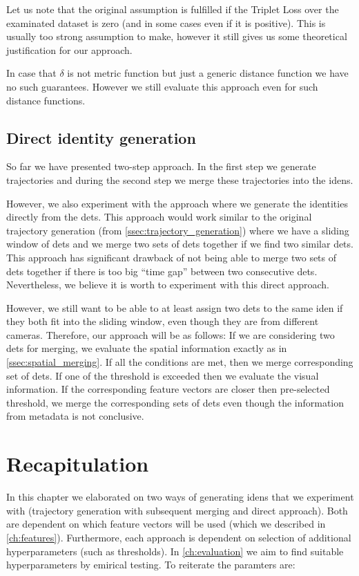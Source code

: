 Let us note that the original assumption is fulfilled if the Triplet Loss
over the examinated dataset is zero (and in some cases even if it is positive).
This is usually too strong assumption to make, however it still gives us some
theoretical justification for our approach.

In case that $\delta$ is not metric function but just a generic distance
function we have no such guarantees. However we still evaluate this approach
even for such distance functions.

\subsection{Direct identity generation}

So far we have presented two-step approach. In the first step we generate
trajectories and during the second step we merge these trajectories into
the \glspl{iden}.

However, we also experiment with the approach where we generate the identities directly from the \glspl{det}. This approach would work similar to the original trajectory generation (from \autoref{ssec:trajectory_generation}) where we have a sliding window of \glspl{det} and we merge two sets of \glspl{det} together if we find two similar \glspl{det}. This approach has significant drawback of not being able to merge two sets of \glspl{det} together if there is too big ``time gap'' between two consecutive \glspl{det}. Nevertheless, we believe it is worth to experiment with this direct approach.

However, we still want to be able to at least assign two \glspl{det} to the
same \gls{iden} if they both fit into the sliding window, even though they are
from different cameras. Therefore, our approach will be as follows: If we are
considering two \glspl{det} for merging, we evaluate the spatial information
exactly as in \autoref{ssec:spatial_merging}. If all the conditions are met,
then we merge corresponding set of \glspl{det}. If one of the threshold is
exceeded then we evaluate the visual information. If the corresponding feature
vectors are closer then pre-selected threshold, we merge the corresponding sets of \glspl{det} even though the information from metadata is not conclusive.

\section{Recapitulation}

In this chapter we elaborated on two ways of generating \glspl{iden} that we experiment with (trajectory generation with subsequent merging and direct approach). Both are dependent on which feature vectors will be used (which we described in \autoref{ch:features}). Furthermore, each approach is dependent on selection of additional hyperparameters (such as thresholds). In \autoref{ch:evaluation} we aim to find suitable hyperparameters by emirical testing. To reiterate the paramters are:

